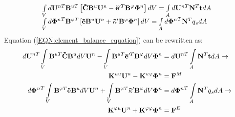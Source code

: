 \begin{equation}  
\begin{array}{l}
\int\limits_V {d{{\bf{U}}^{nT}}{{\bf{B}}^{uT}}\left[ {{\bf{\tilde C}}{{\bf{B}}^u}{{\bf{U}}^n} - {\bf{\tilde e}}{'^T}{{\bf{B}}^\varphi }{{\bf{\Phi }}^n}} \right]dV}  = \int\limits_A {d{{\bf{U}}^{nT}}{{\bf{N}}^T}{\bf{t}}dA} \\
\int\limits_V {d{{\bf{\Phi }}^n}^T{{\bf{B}}^{\varphi T}}\left[ {{\bf{\tilde e}}{{\bf{B}}^u}{{\bf{U}}^n} + {\bf{\tilde \kappa }}'{{\bf{B}}^\varphi }{{\bf{\Phi }}^n}} \right]dV}  = \int\limits_A {d{{\bf{\Phi }}^n}^T{{\bf{N}}^T}q{}_sdA} 
\end{array}
\label{EQN:element_balance_equation}
\end{equation}
Equation (\ref{EQN:element_balance_equation}) can be rewritten as:
\begin{equation}  
\begin{aligned}
d{{\bf{U}}^{nT}}\int\limits_V {{{\bf{B}}^{uT}}{\bf{\tilde
C}}{{\bf{B}}^u}dV{{\bf{U}}^n} - \int\limits_V {{{\bf{B}}^{uT}}{\bf{\tilde 
e}}{'^T}{{\bf{B}}^\varphi }} dV{{\bf{\Phi }}^n}}  &= 
  d{{\bf{U}}^{nT}}\int\limits_A {{{\bf{N}}^T}{\bf{t}}dA} {\rm{   }} \to \\
{{\bf{K}}^{uu}}{{\bf{U}}^n} - {{\bf{K}}^{u\varphi }}{{\bf{\Phi }}^n} &= {{\bf{F}}^M}\\
d{{\bf{\Phi }}^n}^T\int\limits_V {{{\bf{B}}^{\varphi T}}{\bf{\tilde
e}}{{\bf{B}}^u}dV{{\bf{U}}^n} + \int\limits_V {{{\bf{B}}^{\varphi T}}{\bf{\tilde \kappa }}'{{\bf{B}}^\varphi }} dV{{\bf{\Phi }}^n}} & = d{{\bf{\Phi }}^n}^T\int\limits_A {{{\bf{N}}^T}q{}_sdA} {\rm{   }} \to \\
{{\bf{K}}^{\varphi u}}{{\bf{U}}^n} + {{\bf{K}}^{\varphi \varphi }}{{\bf{\Phi }}^n} &= {{\bf{F}}^E}
\end{aligned}
\label{EQN:element_balance_equation_rewritten}  
\end{equation} 

